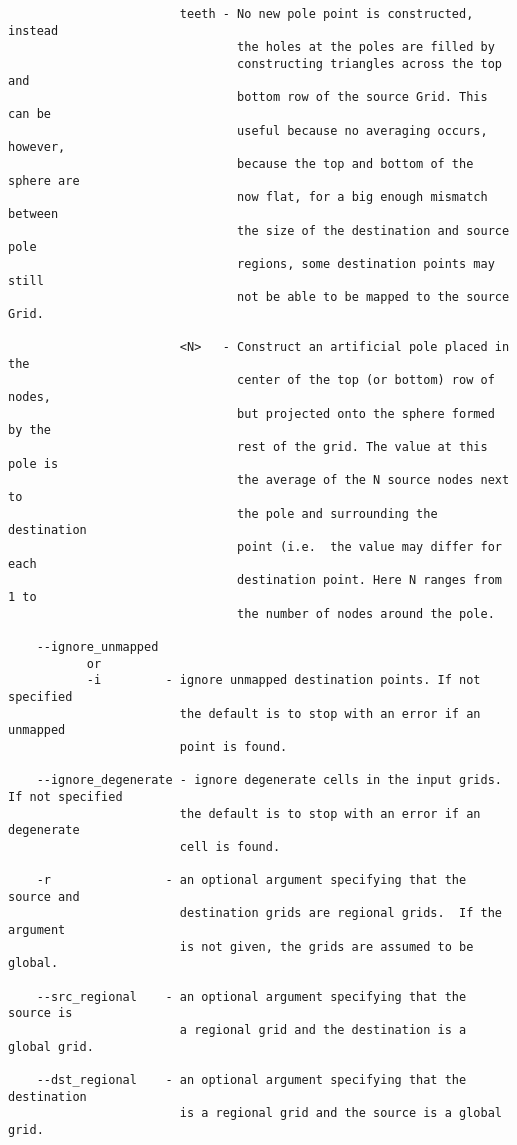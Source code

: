 \begin{verbatim}
                        teeth - No new pole point is constructed, instead
                                the holes at the poles are filled by
                                constructing triangles across the top and
                                bottom row of the source Grid. This can be
                                useful because no averaging occurs, however,
                                because the top and bottom of the sphere are
                                now flat, for a big enough mismatch between
                                the size of the destination and source pole
                                regions, some destination points may still
                                not be able to be mapped to the source Grid.

                        <N>   - Construct an artificial pole placed in the
                                center of the top (or bottom) row of nodes,
                                but projected onto the sphere formed by the
                                rest of the grid. The value at this pole is
                                the average of the N source nodes next to
                                the pole and surrounding the destination
                                point (i.e.  the value may differ for each
                                destination point. Here N ranges from 1 to
                                the number of nodes around the pole.

    --ignore_unmapped
           or
           -i         - ignore unmapped destination points. If not specified
                        the default is to stop with an error if an unmapped
                        point is found.

    --ignore_degenerate - ignore degenerate cells in the input grids. If not specified
                        the default is to stop with an error if an degenerate
                        cell is found.

    -r                - an optional argument specifying that the source and
                        destination grids are regional grids.  If the argument
                        is not given, the grids are assumed to be global.

    --src_regional    - an optional argument specifying that the source is
                        a regional grid and the destination is a global grid.

    --dst_regional    - an optional argument specifying that the destination
                        is a regional grid and the source is a global grid.


\end{verbatim}
